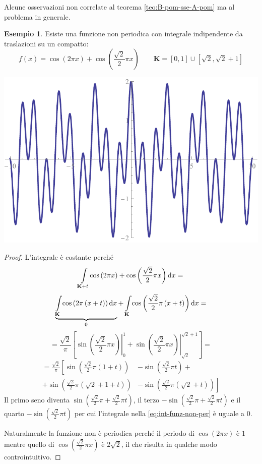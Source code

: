\documentclass[12pt]{article}
\newcommand\ins[1]{\mathbf #1}
\newcommand\intes[2]{\int\limits_{#1}\!#2\text dx}
\theoremstyle{definition}
\newtheorem{esem}{Esempio}
\begin{document}
Alcune osservazioni non correlate al teorema \ref{teo:B-pom-sse-A-pom}
ma al problema in generale.
\begin{esem}Esiste una funzione non periodica con integrale indipendente
da traslazioni su un compatto:
\begin{equation*}
f(x)=\cos\left(2\pi x\right)+\cos\left(\frac{\sqrt2}2\pi x\right)\qquad\ins K=\left[0,1\right]\cup\left[\sqrt2,\sqrt2+1\right]
\end{equation*}
\end{esem}
\begin{center}
\includegraphics*[scale=0.8]{ex4.pdf}
\end{center}
\begin{proof}L'integrale è costante perché
\begin{equation}\label{eq:int-funz-non-per}
\intes{\ins K+t}{\cos\left(2\pi x\right)+\cos\left(\frac{\sqrt2}2\pi x\right)}=
\end{equation}
\begin{equation*}
\underbrace{\intes{\ins K}{\cos\left(2\pi\left(x+t\right)\right)}}_0+\intes{\ins K}{\cos\left(\frac{\sqrt2}2\pi\left(x+t\right)\right)}=
\end{equation*}
\begin{equation*}
=\frac{\sqrt2}\pi\left[\left.\sin\left(\frac{\sqrt2}2\pi x\right)\right|_0^1+\left.\sin\left(\frac{\sqrt2}2\pi x\right)\right|_{\sqrt2}^{\sqrt2+1}\right]=
\end{equation*}
\begin{equation*}\begin{split}
=\frac{\sqrt2}\pi\left[\sin\left(\frac{\sqrt2}2\pi\left(1+t\right)\right)\right.&
-\sin\left(\frac{\sqrt2}2\pi t\right)+\\
+\sin\left(\frac{\sqrt2}2\pi\left(\sqrt2+1+t\right)\right)&
\left.-\sin\left(\frac{\sqrt2}2\pi\left(\sqrt2+t\right)\right)\right]
\end{split}\end{equation*}
Il primo seno diventa $\sin\left(\frac{\sqrt2}2\pi+\frac{\sqrt2}2\pi t\right)$,
il terzo $-\sin\left(\frac{\sqrt2}2\pi+\frac{\sqrt2}2\pi t\right)$
e il quarto $-\sin\left(\frac{\sqrt2}2\pi t\right)$ per cui l'integrale
nella \eqref{eq:int-funz-non-per} è uguale a $0$.
 
Naturalmente la funzione non è periodica perché il periodo di $\cos(2\pi x)$
è $1$ mentre quello di $\cos\left(\frac{\sqrt2}2\pi x\right)$ è $2\sqrt2$,
il che risulta in qualche modo controintuitivo.
\end{proof}
\end{document}
